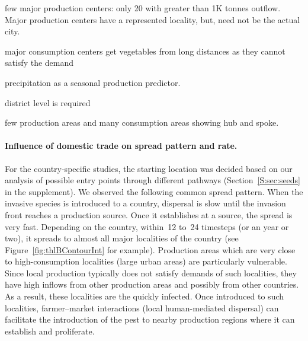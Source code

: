 \documentclass[11pt]{article}
\theoremstyle{definition}
\begin{document}
few major production centers: only 20 with greater than 1K tonnes outflow.
Major production centers have a represented locality, but, need not be the
actual city.

major consumption centers get vegetables from long distances as they cannot
satisfy the demand

precipitation as a seasonal production predictor.

district level is required

few production areas and many consumption areas showing hub and spoke.


\paragraph{Influence of domestic trade on spread pattern and rate.}
For the country-specific studies, the starting location was decided based
on our analysis of possible entry points through different pathways
(Section~\ref{S:sec:seeds} in the supplement).  We observed the following
common spread pattern.  When the invasive species is introduced to a
country, dispersal is slow until the invasion front reaches a {production
source}. Once it establishes at a source, the spread is very fast.
Depending on the country, within~12 to~24 timesteps (or an year or two), it spreads to almost all major localities of the country
(see Figure~\ref{fig:thlBContourInt} for example). Production areas which
are very close to high-consumption localities (large urban areas) are
particularly vulnerable. Since local production typically does not satisfy
demands of such localities, they have high inflows from other production
areas and possibly from other countries. As a result, these localities are
the quickly infected. Once introduced to such localities, farmer--market
interactions (local human-mediated dispersal) can facilitate the
introduction of the pest to nearby production regions where it can
establish and proliferate.
\end{document}

